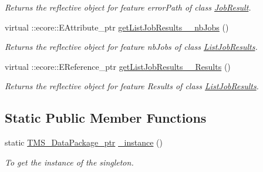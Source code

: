 \begin{DoxyCompactItemize}
\begin{DoxyCompactList}\small\item\em Returns the reflective object for feature errorPath of class \hyperlink{classTMS__Data_1_1JobResult}{JobResult}. \item\end{DoxyCompactList}\item 
virtual ::ecore::EAttribute\_\-ptr \hyperlink{classTMS__Data_1_1TMS__DataPackage_ae84709b073a59a2a40ed8118c445a8b8}{getListJobResults\_\-\_\-nbJobs} ()
\begin{DoxyCompactList}\small\item\em Returns the reflective object for feature nbJobs of class \hyperlink{classTMS__Data_1_1ListJobResults}{ListJobResults}. \item\end{DoxyCompactList}\item 
virtual ::ecore::EReference\_\-ptr \hyperlink{classTMS__Data_1_1TMS__DataPackage_a1dae0cd08e537bcc34bf99dc85fa337b}{getListJobResults\_\-\_\-Results} ()
\begin{DoxyCompactList}\small\item\em Returns the reflective object for feature Results of class \hyperlink{classTMS__Data_1_1ListJobResults}{ListJobResults}. \item\end{DoxyCompactList}\end{DoxyCompactItemize}
\subsection*{Static Public Member Functions}
\begin{DoxyCompactItemize}
\item 
static \hyperlink{classTMS__Data_1_1TMS__DataPackage}{TMS\_\-DataPackage\_\-ptr} \hyperlink{classTMS__Data_1_1TMS__DataPackage_ae84dd6b274b381ea1055455b189e633e}{\_\-instance} ()
\begin{DoxyCompactList}\small\item\em To get the instance of the singleton. \item\end{DoxyCompactList}\end{DoxyCompactItemize}
